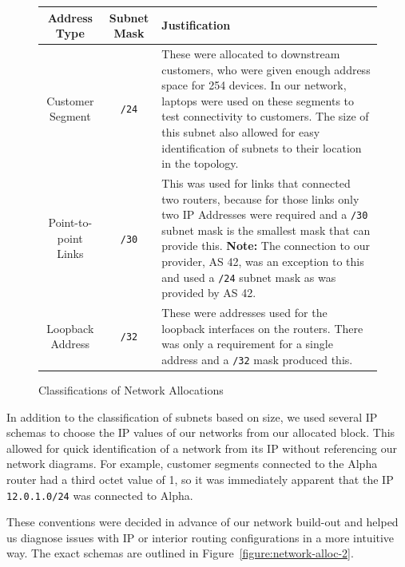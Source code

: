 \begin{figure}[!ht]
    \caption{Classifications of Network Allocations}
    \label{figure:network-alloc-1}
    \centering
    \begin{tabular}{|c|c|p{5.5cm}|}

        \hline
        \textbf{Address Type} & \textbf{Subnet Mask} & \textbf{Justification} \\

        \hline
        Customer Segment & \texttt{/24} & These were allocated to downstream
        customers, who were given enough address space for 254 devices. In our
        network, laptops were used on these segments to test connectivity to
        customers. The size of this subnet also allowed for easy identification
        of subnets to their location in the topology.\\

        \hline
        Point-to-point Links & \texttt{/30} & This was used for links that
        connected two routers, because for those links only two IP Addresses
        were required and a \texttt{/30} subnet mask is the smallest mask that
        can provide this.
        \textbf{Note:} The connection to our provider, AS 42, was an exception
        to this and used a \texttt{/24} subnet mask as was provided by AS 42.\\

        \hline
        Loopback Address & \texttt{/32} & These were addresses used for the
        loopback interfaces on the routers. There was only a requirement for a
        single address and a \texttt{/32} mask produced this.\\

        \hline
    \end{tabular}
\end{figure}
In addition to the classification of subnets based on size, we used several IP
schemas to choose the IP values of our networks from our allocated block. This
allowed for quick identification of a network from its IP without referencing
our network diagrams. For example, customer segments connected to the Alpha
router had a third octet value of 1, so it was immediately apparent that the IP
\texttt{12.0.1.0/24} was connected to Alpha.

These conventions were decided in advance of our network build-out and helped
us diagnose issues with IP or interior routing configurations in a more
intuitive way. The exact schemas are outlined in Figure~\ref{figure:network-alloc-2}.

